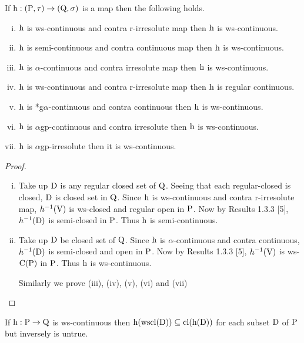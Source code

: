 \begin{thm}\label{thm3.2.6}
If $\mathrm{h}: (\mathrm{P},\tau )\to (\mathrm{Q}, \sigma)$ is a map then the following holds.
\begin{enumerate}[(i)]
\item $\mathrm{h}$ is ws-continuous and contra r-irresolute map then $\mathrm{h}$ is ws-continuous.
\item $\mathrm{h}$ is semi-continuous and contra continuous map then $\mathrm{h}$ is ws-continuous.
\item $\mathrm{h}$ is $\alpha$-continuous and contra irresolute map then $\mathrm{h}$ is ws-continuous.
\item $\mathrm{h}$ is ws-continuous and contra r-irresolute map then $\mathrm{h}$ is regular continuous.
\item $\mathrm{h}$ is *g$\alpha$-continuous and contra continuous then $\mathrm{h}$ is ws-continuous.
\item $\mathrm{h}$ is $\alpha$gp-continuous and contra irresolute then $\mathrm{h}$ is ws-continuous.
\item $\mathrm{h}$ is $\alpha$gp-irresolute then it is ws-continuous.
\end{enumerate}
\end{thm}

\begin{proof}
\begin{enumerate}[(i)]
\item Take up $\mathrm{D}$ is any regular closed set of $\mathrm{Q}$. Seeing that each regular-closed is closed, $\mathrm{D}$ is closed set in $\mathrm{Q}$. Since $\mathrm{h}$ is ws-continuous and contra r-irresolute map, $h^{-1} (\mathrm{V})$ is ws-closed and regular open in $\mathrm{P}$. Now by Results 1.3.3 [5], $h^{-1} (\mathrm{D})$ is semi-closed in $\mathrm{P}$. Thus $\mathrm{h}$ is semi-continuous.

\item Take up $\mathrm{D}$ be closed set of $\mathrm{Q}$. Since $\mathrm{h}$ is $\alpha$-continuous and contra continuous, $h^{-1} (\mathrm{D})$ is semi-closed and open in $\mathrm{P}$. Now by Results 1.3.3 [5], $h^{-1} (\mathrm{V})$ is ws-$\mathrm{C}(\mathrm{P})$ in $\mathrm{P}$. Thus $\mathrm{h}$ is ws-continuous.

Similarly we prove (iii), (iv), (v), (vi) and (vii)
\end{enumerate}
\end{proof}

\begin{thm}\label{thm3.2.7}
If $\mathrm{h}: \mathrm{P}\to \mathrm{Q}$ is ws-continuous then $\mathrm{h}(\mathrm{wscl}(\mathrm{D}))\subseteq \mathrm{cl}(\mathrm{h}(\mathrm{D}))$ for each subset $\mathrm{D}$ of $\mathrm{P}$ but inversely is untrue.
\end{thm}

